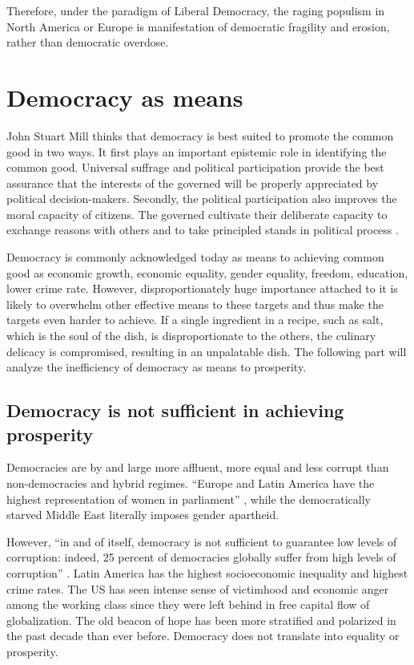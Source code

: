 \documentclass{scrartcl}
\theoremstyle{definition}
\begin{document}
Therefore, under the paradigm of Liberal Democracy, the raging populism in North America or Europe is manifestation of democratic fragility and erosion, rather than democratic overdose. 

\section{Democracy as means}

John Stuart Mill thinks that democracy is best suited to promote the common good in two ways. It first plays an important epistemic role in identifying the common good. Universal suffrage and political participation provide the best assurance that the interests of the governed will be properly appreciated by political decision-makers. Secondly, the political participation also improves the moral capacity of citizens. The governed cultivate their deliberate capacity to exchange reasons with others and to take principled stands in political process \autocite{Mill_2010}.

Democracy is commonly acknowledged today as means to achieving common good as economic growth, economic equality, gender equality, freedom, education, lower crime rate. However, disproportionately huge importance attached to it is likely to overwhelm other effective means to these targets and thus make the targets even harder to achieve. If a single ingredient in a recipe, such as salt, which is the soul of the dish, is disproportionate to the others, the culinary delicacy is compromised, resulting in an unpalatable dish. The following part will analyze the inefficiency of democracy as means to prosperity. 

\subsection{Democracy is not sufficient in achieving prosperity}

Democracies are by and large more affluent, more equal and less corrupt than non-democracies and hybrid regimes. ``Europe and Latin America have the highest representation of women in parliament'' \autocite[6]{IDEA}, while the democratically starved Middle East literally imposes gender apartheid.

However, ``in and of itself, democracy is not sufficient to guarantee low levels of corruption: indeed, 25 percent of democracies globally suffer from high levels of corruption'' \autocite[3]{IDEA}. Latin America has the highest socioeconomic inequality and highest crime rates. The US has seen intense sense of victimhood and economic anger among the working class since they were left behind in free capital flow of globalization. The old beacon of hope has been more stratified and polarized in the past decade than ever before. Democracy does not translate into equality or prosperity.
\end{document}
